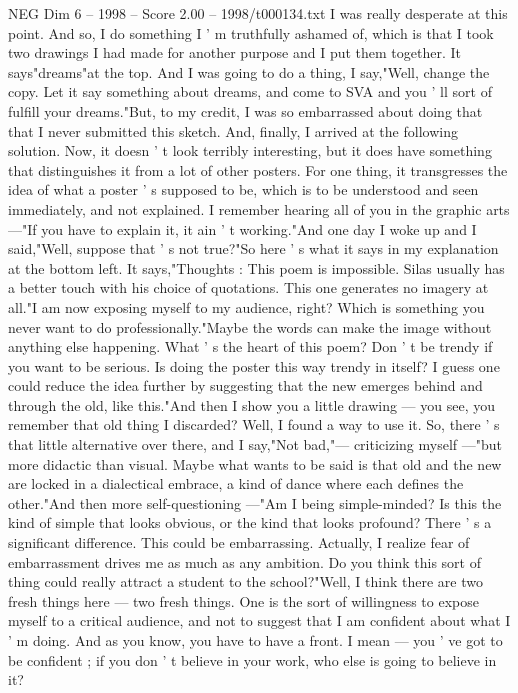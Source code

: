 \begin{textsample}{NEG Dim 6 – 1998 – Score 2.00 – 1998/t000134.txt}
I was really desperate at this point.
And so, I do something I ' m truthfully ashamed of, which is that I took two drawings I had made for another purpose and I put them together.
It says"dreams"at the top.
And I was going to do a thing, I say,"Well, change the copy.
Let it say something about dreams, and come to SVA and you ' ll sort of fulfill your dreams."But, to my credit, I was so embarrassed about doing that that I never submitted this sketch.
And, finally, I arrived at the following solution.
Now, it doesn ' t look terribly interesting, but it does have something that distinguishes it from a lot of other posters.
For one thing, it transgresses the idea of what a poster ' s supposed to be, which is to be understood and seen immediately, and not explained.
I remember hearing all of you in the graphic arts —"If you have to explain it, it ain ' t working."And one day I woke up and I said,"Well, suppose that ' s not true?"So here ' s what it says in my explanation at the bottom left.
It says,"Thoughts : This poem is impossible.
Silas usually has a better touch with his choice of quotations.
This one generates no imagery at all."I am now exposing myself to my audience, right?
Which is something you never want to do professionally."Maybe the words can make the image without anything else happening.
What ' s the heart of this poem?
Don ' t be trendy if you want to be serious.
Is doing the poster this way trendy in itself?
I guess one could reduce the idea further by suggesting that the new emerges behind and through the old, like this."And then I show you a little drawing — you see, you remember that old thing I discarded?
Well, I found a way to use it.
So, there ' s that little alternative over there, and I say,"Not bad,"— criticizing myself —"but more didactic than visual.
Maybe what wants to be said is that old and the new are locked in a dialectical embrace, a kind of dance where each defines the other."And then more self-questioning —"Am I being simple-minded?
Is this the kind of simple that looks obvious, or the kind that looks profound?
There ' s a significant difference.
This could be embarrassing.
Actually, I realize fear of embarrassment drives me as much as any ambition.
Do you think this sort of thing could really attract a student to the school?"Well, I think there are two fresh things here — two fresh things.
One is the sort of willingness to expose myself to a critical audience, and not to suggest that I am confident about what I ' m doing.
And as you know, you have to have a front.
I mean — you ' ve got to be confident ; if you don ' t believe in your work, who else is going to believe in it?

\end{textsample}
